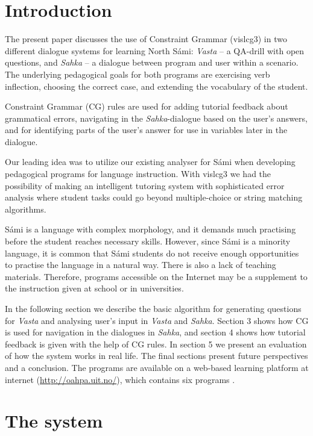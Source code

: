 \documentclass[11pt]{article}
\begin{document}
\section{Introduction} 

The present paper discusses the use of Constraint Grammar (vislcg3) in two different dialogue systems for learning North Sámi: \textit{Vasta} -- a QA-drill with open questions, and \textit{Sahka} -- a  dialogue between program and user within a scenario. The underlying pedagogical goals for both programs are exercising verb inflection, choosing the correct case, and extending the vocabulary of the student. 

Constraint Grammar (CG) rules are used for adding tutorial feedback about grammatical errors, navigating in the \textit{Sahka}-dialogue based on the user's answers, and for identifying parts of the user's answer for use in variables later in the dialogue. 

Our leading idea was to utilize our existing analyser for Sámi when developing pedagogical programs for language instruction. With vislcg3 we had the possibility of making an intelligent tutoring system with sophisticated error analysis where student tasks could go beyond multiple-choice or string matching algorithms. 

Sámi is a language with complex morphology, and it demands much practising before the student reaches necessary skills. However, since Sámi is a minority language, it is common that Sámi students do not receive enough opportunities to practise the language in a natural way. There is also a lack of teaching materials. Therefore, programs accessible on the Internet may be a supplement to the instruction given at school or in universities.

In the following section we describe the basic algorithm for generating questions for \textit{Vasta} and analysing user's input in \textit{Vasta} and \textit{Sahka}. Section 3 shows how CG is used for navigation in the dialogues in \textit{Sahka}, and section 4 shows how tutorial feedback is given with the help of CG rules. In section 5 we present an evaluation of how the system works in real life. The final sections present future perspectives and a conclusion. The programs are available on a web-based learning platform at internet (\url{http://oahpa.uit.no/}), which contains six programs \cite{Antonsen:09}.

\section{The system}
\end{document}
